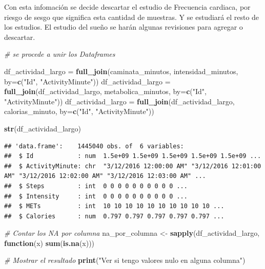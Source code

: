 \documentclass[
]{article}
\newenvironment{Shaded}{\begin{snugshade}}{\end{snugshade}}
\newcommand{\AttributeTok}[1]{\textcolor[rgb]{0.13,0.29,0.53}{#1}}
\newcommand{\CommentTok}[1]{\textcolor[rgb]{0.56,0.35,0.01}{\textit{#1}}}
\newcommand{\ControlFlowTok}[1]{\textcolor[rgb]{0.13,0.29,0.53}{\textbf{#1}}}
\newcommand{\FunctionTok}[1]{\textcolor[rgb]{0.13,0.29,0.53}{\textbf{#1}}}
\newcommand{\NormalTok}[1]{#1}
\newcommand{\OtherTok}[1]{\textcolor[rgb]{0.56,0.35,0.01}{#1}}
\newcommand{\StringTok}[1]{\textcolor[rgb]{0.31,0.60,0.02}{#1}}
\begin{document}
Con esta infomación se decide descartar el estudio de Frecuencia
cardiaca, por riesgo de sesgo que significa esta cantidad de muestras. Y
se estudiará el resto de los estudios. El estudio del sueño se harán
algunas revisiones para agregar o descartar.

\begin{Shaded}
\begin{Highlighting}[]
\CommentTok{\# se procede a unir los Dataframes}

\NormalTok{df\_actividad\_largo }\OtherTok{=} \FunctionTok{full\_join}\NormalTok{(caminata\_minutos, intensidad\_minutos, }\AttributeTok{by=}\FunctionTok{c}\NormalTok{(}\StringTok{"Id"}\NormalTok{, }\StringTok{"ActivityMinute"}\NormalTok{))}
\NormalTok{df\_actividad\_largo }\OtherTok{=} \FunctionTok{full\_join}\NormalTok{(df\_actividad\_largo, metabolica\_minutos, }\AttributeTok{by=}\FunctionTok{c}\NormalTok{(}\StringTok{"Id"}\NormalTok{, }\StringTok{"ActivityMinute"}\NormalTok{))}
\NormalTok{df\_actividad\_largo }\OtherTok{=} \FunctionTok{full\_join}\NormalTok{(df\_actividad\_largo, calorias\_minuto, }\AttributeTok{by=}\FunctionTok{c}\NormalTok{(}\StringTok{"Id"}\NormalTok{, }\StringTok{"ActivityMinute"}\NormalTok{))}

\FunctionTok{str}\NormalTok{(df\_actividad\_largo)}
\end{Highlighting}
\end{Shaded}

\begin{verbatim}
## 'data.frame':    1445040 obs. of  6 variables:
##  $ Id            : num  1.5e+09 1.5e+09 1.5e+09 1.5e+09 1.5e+09 ...
##  $ ActivityMinute: chr  "3/12/2016 12:00:00 AM" "3/12/2016 12:01:00 AM" "3/12/2016 12:02:00 AM" "3/12/2016 12:03:00 AM" ...
##  $ Steps         : int  0 0 0 0 0 0 0 0 0 0 ...
##  $ Intensity     : int  0 0 0 0 0 0 0 0 0 0 ...
##  $ METs          : int  10 10 10 10 10 10 10 10 10 10 ...
##  $ Calories      : num  0.797 0.797 0.797 0.797 0.797 ...
\end{verbatim}

\begin{Shaded}
\begin{Highlighting}[]
\CommentTok{\# Contar los NA por columna}
\NormalTok{na\_por\_columna }\OtherTok{\textless{}{-}} \FunctionTok{sapply}\NormalTok{(df\_actividad\_largo, }\ControlFlowTok{function}\NormalTok{(x) }\FunctionTok{sum}\NormalTok{(}\FunctionTok{is.na}\NormalTok{(x)))}

\CommentTok{\# Mostrar el resultado}
\FunctionTok{print}\NormalTok{(}\StringTok{"Ver si tengo valores nulo en alguna columna"}\NormalTok{)}
\end{Highlighting}
\end{Shaded}
\end{document}
